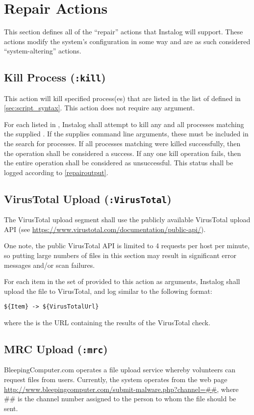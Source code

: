 \section{Repair Actions} \label{sec:repair_actions}
This section defines all of the ``repair'' actions that Instalog will support. 
These actions modify the system's configuration in some way and are as such
considered ``system-altering'' actions. \label{systemaltering}

\subsection{Kill Process (\texttt{:kill})}
This action will kill specified process(es) that are listed in the list of
 defined in \ref{sec:script_syntax}.  This action does not require
any argument.  

For each  listed in , Instalog shall attempt to kill any
and all processes matching the supplied .  If the 
supplies command line arguments, these must be included in the search for
processes.  If all processes matching  were killed successfully,
then the operation shall be considered a success.  If any one kill operation
fails, then the entire operation shall be considered as unsuccessful.  This
status shall be logged according to \ref{repairoutput}.

\subsection{VirusTotal Upload (\texttt{:VirusTotal})}
The VirusTotal upload segment shall use the publicly available VirusTotal
upload API (see \url{https://www.virustotal.com/documentation/public-api/}).

One note, the public VirusTotal API is limited to 4 requests per host per
minute, so putting large numbers of files in this section may result in
significant error messages and/or scan failures.

For each item in the set of  provided to this action as arguments,
Instalog shall upload the file to VirusTotal, and log similar to the following
format:
\begin{verbatim}
${Item} -> ${VirusTotalUrl}
\end{verbatim}
where the  is the URL containing the results of the
VirusTotal check.

\subsection{MRC Upload (\texttt{:mrc})}
BleepingComputer.com operates a file upload service whereby volunteers can
request files from users. Currently, the system operates from the web page
\url{http://www.bleepingcomputer.com/submit-malware.php?channel=##}, where \#\#
is the channel number assigned to the person to whom the file should be sent.

